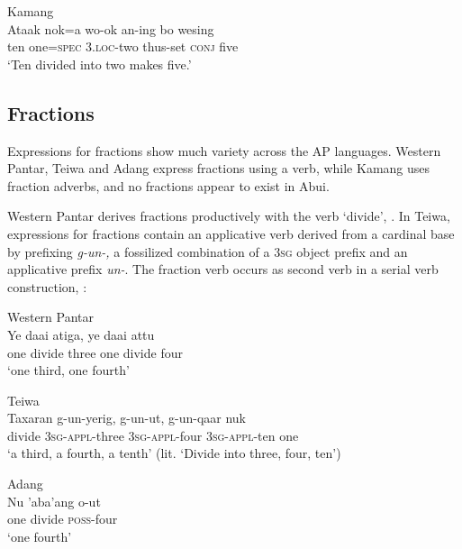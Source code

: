 \ea
\label{ex:8:1247}
{\upshape Kamang}\\
 \gll Ataak  nok=a  wo-ok  an-ing  bo  wesing \\
  ten  one=\textsc{spec}  \textsc{3.loc}-two  thus-set  \textsc{conj}  five \\
 \glt`Ten divided into two makes five.'
\z


\subsection{Fractions}
\label{sec:8:Fractions}
Expressions for fractions show much variety across the AP languages. Western Pantar, Teiwa and Adang express fractions using a verb, while Kamang uses fraction adverbs, and no fractions appear to exist in Abui. 

Western Pantar derives fractions productively with the verb `divide', . In Teiwa, expressions for fractions contain an applicative verb derived from a cardinal base by prefixing \textit{g-un-,} a fossilized combination of a 3\textsc{sg} object prefix and an applicative prefix \textit{un-}. The fraction verb occurs as second verb in a serial verb construction, : 


\ea%
\label{bkm:Ref342746525}
{\upshape Western Pantar}\\
\gll   Ye  daai  atiga,  ye   daai  attu\\  
   one   divide  three   one  divide  four \\
\glt  `one third, one fourth'   
\z

 

\ea%
\label{bkm:Ref342746583}
{\upshape Teiwa}\\
\gll  Taxaran  g-un-yerig,  g-un-ut,  g-un-qaar nuk \\  
   divide  \textsc{3sg}-\textsc{appl}-three  \textsc{3sg}-\textsc{appl}-four  \textsc{3sg}-\textsc{appl}-ten one   \\
\glt  `a third, a fourth, a tenth' (lit. `Divide into three, four, ten')
\z


 

\ea
\label{ex:8:1248}
{\upshape Adang}\\
\gll Nu  'aba'ang  o-ut\\
  one  divide  \textsc{poss}{}-four\\
\glt `one fourth'
\z 

